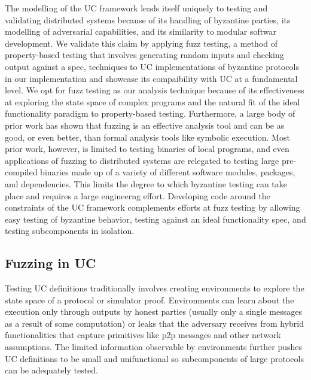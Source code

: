 The modelling of the UC framework lends itself uniquely to testing and validating distributed systems because of its handling of byzantine parties, its modelling of adversarial capabilities, and its similarity to modular softwar development.
We validate this claim by applying fuzz testing, a method of property-based testing that involves generating random inputs and checking output against a spec, techniques to UC implementations of byzantine protocols in our implementation and showcase its compaibility with UC at a fundamental level.
We opt for fuzz testing as our analysis technique because of its effectiveness at exploring the state space of complex programs and the natural fit of the ideal functionality paradigm to property-based testing.
Furthermore, a large body of prior work has shown that fuzzing is an effective analysis tool and can be as good, or even better, than formal analysis tools like symbolic execution.
Most prior work, however, is limited to testing binaries of local programs, and even applications of fuzzing to distributed systems are relegated to testing large pre-compiled binaries made up of a variety of different software modules, packages, and dependencies.
This limits the degree to which byzantine testing can take place and requires a large engineerng effort.
Developing code around the constraints of the UC framework complements efforts at fuzz testing by allowing easy testing of byzantine behavior, testing against an ideal functionality spec, and testing subcomponents in isolation.

\subsection{Fuzzing in UC}
Testing UC definitions traditionally involves creating environments to explore the state space of a protocol or simulator proof.
Environments can learn about the execution only through outputs by honest parties (usually only a single messages as a result of some computation) or leaks that the adversary receives from hybrid functionalities that capture primitives like p2p messages and other network assumptions.
The limited information observable by environments further pushes UC definitions to be small and unifunctional so subcomponents of large protocols can be adequately tested.

